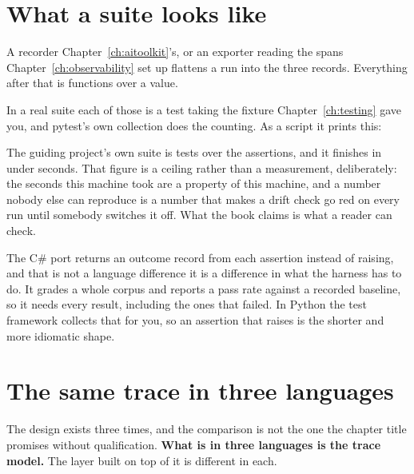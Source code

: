 \section{What a suite looks like}
\label{sec:ch14-suite}

A recorder \dash{} Chapter~\ref{ch:aitoolkit}'s, or an exporter reading the
spans Chapter~\ref{ch:observability} set up \dash{} flattens a run into the
three records. Everything after that is functions over a value.


\noindent
In a real suite each of those is a test taking the  fixture
Chapter~\ref{ch:testing} gave you, and pytest's own collection does the
counting. As a script it prints this:


\noindent
The guiding project's own suite is  tests over the
 assertions, and it finishes in under 
seconds. That figure is a ceiling rather than a measurement, deliberately:
the seconds this machine took are a property of this machine, and a number
nobody else can reproduce is a number that makes a drift check go red on
every run until somebody switches it off. What the book claims is what a
reader can check.

\begin{csbox}
The C\# port returns an outcome record from each assertion instead of
raising, and that is not a language difference \dash{} it is a difference
in what the harness has to do. It grades a whole corpus and reports a pass
rate against a recorded baseline, so it needs every result, including the
ones that failed. In Python the test framework collects that for you, so
an assertion that raises is the shorter and more idiomatic shape.
\end{csbox}

\section{The same trace in three languages}
\label{sec:ch14-ports}

The design exists three times, and the comparison is not the one the
chapter title promises without qualification. \textbf{What is in three
languages is the trace model.} The layer built on top of it is different in
each.


